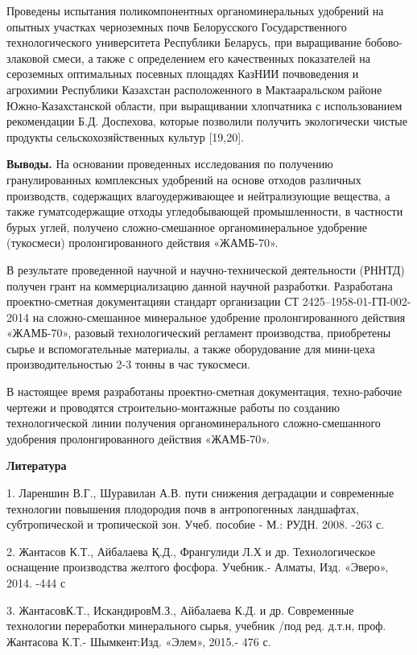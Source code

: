 Проведены испытания поликомпонентных органоминеральных удобрений на
опытных участках черноземных почв Белорусского Государственного
технологического университета Республики Беларусь, при выращивание
бобово-злаковой смеси, а также с определением его качественных
показателей на сероземных оптимальных посевных площадях КазНИИ
почвоведения и агрохимии Республики Казахстан расположенного в
Мактааральском районе Южно-Казахстанской области, при выращивании
хлопчатника с использованием рекомендации Б.Д. Доспехова, которые
позволили получить экологически чистые продукты сельскохозяйственных
культур {[}19,20{]}.

{\bfseries Выводы.} На основании проведенных исследования по получению
гранулированных комплексных удобрений на основе отходов различных
производств, содержащих влагоудерживающее и нейтрализующие вещества, а
также гуматсодержащие отходы угледобывающей промышленности, в частности
бурых углей, получено сложно-смешанное органоминеральное удобрение
(тукосмеси) пролонгированного действия «ЖАМБ-70».

В результате проведенной научной и научно-технической деятельности
(РННТД) получен грант на коммерциализацию данной научной разработки.
Разработана проектно-сметная документацияи стандарт организации СТ
2425--1958-01-ГП-002-2014 на сложно-смешанное минеральное удобрение
пролонгированного действия «ЖАМБ-70», разовый технологический регламент
производства, приобретены сырье и вспомогательные материалы, а также
оборудование для мини-цеха производительностью 2-3 тонны в час
тукосмеси.

В настоящее время разработаны проектно-сметная документация,
техно-рабочие чертежи и проводятся строительно-монтажные работы по
созданию технологической линии получения органоминерального
сложно-смешанного удобрения пролонгированного действия «ЖАМБ-70».

{\bfseries Литература}

1. Лареншин В.Г., Шуравилан А.В. пути снижения деградации и современные
технологии повышения плодородия почв в антропогенных ландшафтах,
субтропической и тропической зон. Учеб. пособие - М.: РУДН. 2008. -263
с.

2. Жантасов К.Т., Айбалаева Қ.Д., Франгулиди Л.Х и др. Технологическое
оснащение производства желтого фосфора. Учебник.- Алматы, Изд. «Эверо»,
2014. -444 с

3. ЖантасовК.Т., ИскандировМ.З., Айбалаева К.Д. и др. Современные
технологии переработки минерального сырья, учебник /под ред. д.т.н,
проф. Жантасова К.Т.- Шымкент:Изд. «Элем», 2015.- 476 с.


